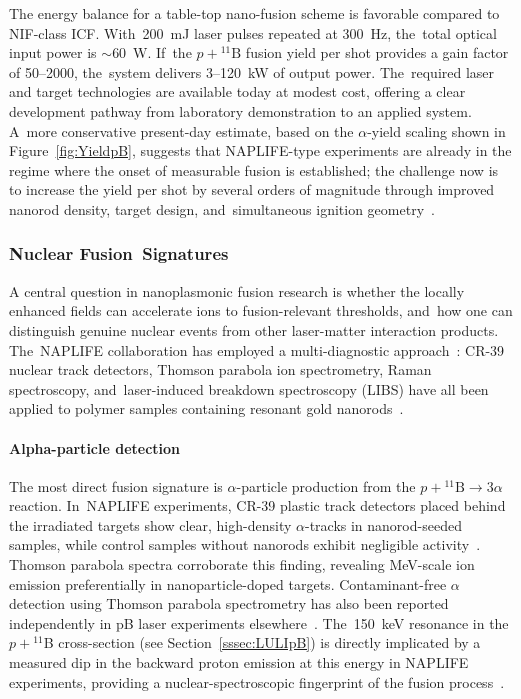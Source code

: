 \documentclass[particles,article,accept,pdftex,moreauthors]{Definitions/mdpi}
\begin{document}
The energy balance for a table-top nano-fusion scheme is favorable compared to NIF-class ICF. With~200~mJ laser pulses repeated at 300~Hz, the~total optical input power is $\sim$60~W. If~the $p+{}^{11}\mathrm{B}$ fusion yield per shot provides a gain factor of 50--2000, the~system delivers 3--120~kW of output power. The~required laser and target technologies are available today at modest cost, offering a clear development pathway from laboratory demonstration to an applied system. A~more conservative present-day estimate, based on the $\alpha$-yield scaling shown in Figure~\ref{fig:YieldpB}, suggests that NAPLIFE-type experiments are already in the regime where the onset of measurable fusion is established; the challenge now is to increase the yield per shot by several orders of magnitude through improved nanorod density, target design, and~simultaneous ignition geometry~\cite{Csernai:2026MDPI,Csernai:2024Universe}.


\subsubsection{Nuclear Fusion~Signatures}\label{sssec:FusionSigs}

A central question in nanoplasmonic fusion research is whether the locally enhanced fields can accelerate ions to fusion-relevant thresholds, and~how one can distinguish genuine nuclear events from other laser-matter interaction products. The~NAPLIFE collaboration has employed a multi-diagnostic approach~\cite{mcnamee2025contaminant,Csernai:2023PRE}: CR-39 nuclear track detectors, Thomson parabola ion spectrometry, Raman spectroscopy, and~laser-induced breakdown spectroscopy (LIBS) have all been applied to polymer samples containing resonant gold nanorods~\cite{tamas2025nanofusion,Kroo2024pB}.

\vspace{-6pt}\paragraph*{\bf Alpha-particle detection}
The most direct fusion signature is $\alpha$-particle production from the $p+{}^{11}\mathrm{B}\to 3\alpha$ reaction. In~NAPLIFE experiments, CR-39 plastic track detectors placed behind the irradiated targets show clear, high-density $\alpha$-tracks in nanorod-seeded samples, while control samples without nanorods exhibit negligible activity~\cite{Kroo2024pB}. Thomson parabola spectra corroborate this finding, revealing MeV-scale ion emission preferentially in nanoparticle-doped targets. Contaminant-free $\alpha$ detection using Thomson parabola spectrometry has also been reported independently in pB laser experiments elsewhere~\cite{mcnamee2025contaminant}. The~150~keV resonance in the $p+{}^{11}$B cross-section (see Section~\ref{sssec:LULIpB}) is directly implicated by a measured dip in the backward proton emission at this energy in NAPLIFE experiments, providing a nuclear-spectroscopic fingerprint of the fusion process~\cite{Kroo2024pB}.
\end{document}
